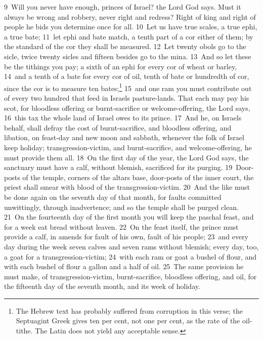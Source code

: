 \documentclass[10pt]{book} %
\begin{document}
\textcolor{benred8}{9}~Will you never have enough, princes of Israel? the Lord God says. Must it always be wrong and robbery, never right and redress? Right of king and right of people he bids you determine once for all. \textcolor{benred8}{10}~Let us have true scales, a true ephi, a true bate; \textcolor{benred8}{11}~let ephi and bate match, a tenth part of a cor either of them; by the standard of the cor they shall be measured. \textcolor{benred8}{12}~Let twenty obols go to the sicle, twice twenty sicles and fifteen besides go to the mina. \textcolor{benred8}{13}~And so let these be the tithings you pay; a sixth of an ephi for every cor of wheat or barley, \textcolor{benred8}{14}~and a tenth of a bate for every cor of oil, tenth of bate or hundredth of cor, since the cor is to measure ten bates;\footnote[3]{The Hebrew text has probably suffered from corruption in this verse; the Septuagint Greek gives ten per cent, not one per cent, as the rate of the oil-tithe. The Latin does not yield any acceptable sense.} \textcolor{benred8}{15}~and one ram you must contribute out of every two hundred that feed in Israel\textquotesingle s pasture-lands. That each may pay his scot, for bloodless offering or burnt-sacrifice or welcome-offering, the Lord says, \textcolor{benred8}{16}~this tax the whole land of Israel owes to its prince. \textcolor{benred8}{17}~And he, on Israel\textquotesingle s behalf, shall defray the cost of burnt-sacrifice, and bloodless offering, and libation, on feast-day and new moon and sabbath, whenever the folk of Israel keep holiday; transgression-victim, and burnt-sacrifice, and welcome-offering, he must provide them all.
\textcolor{benred8}{18}~On the first day of the year, the Lord God says, the sanctuary must have a calf, without blemish, sacrificed for its purging. \textcolor{benred8}{19}~Door-posts of the temple, corners of the altar\textquotesingle s base, door-posts of the inner court, the priest shall smear with blood of the transgression-victim. \textcolor{benred8}{20}~And the like must be done again on the seventh day of that month, for faults committed unwittingly, through inadvertence; and so the temple shall be purged clean. \textcolor{benred8}{21}~On the fourteenth day of the first month you will keep the paschal feast, and for a week eat bread without leaven. \textcolor{benred8}{22}~On the feast itself, the prince must provide a calf, in amends for fault of his own, fault of his people; \textcolor{benred8}{23}~and every day during the week seven calves and seven rams without blemish; every day, too, a goat for a transgression-victim; \textcolor{benred8}{24}~with each ram or goat a bushel of flour, and with each bushel of flour a gallon and a half of oil. \textcolor{benred8}{25}~The same provision he must make, of transgression-victim, burnt-sacrifice, bloodless offering, and oil, for the fifteenth day of the seventh month, and its week of holiday.
\end{document}
